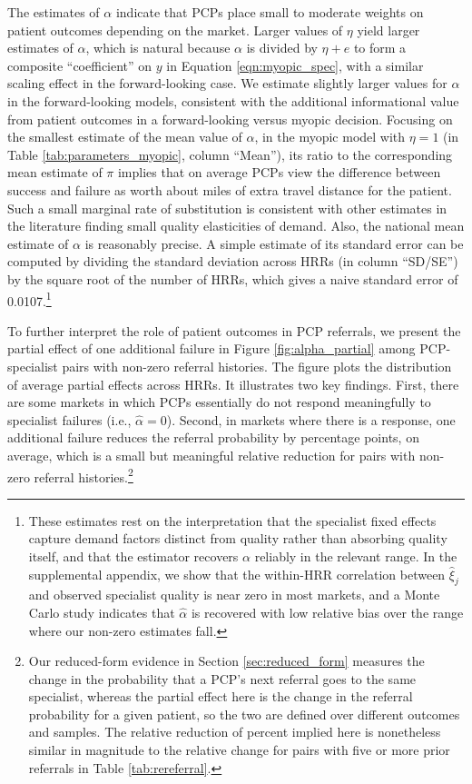 \documentclass[12pt]{article}
\begin{document}
The estimates of $\alpha$ indicate that PCPs place small to moderate weights on patient outcomes depending on the market. Larger values of $\eta$ yield larger estimates of $\alpha$, which is natural because $\alpha$ is divided by $\eta + e$ to form a composite ``coefficient'' on $y$ in Equation \eqref{eqn:myopic_spec}, with a similar scaling effect in the forward-looking case. We estimate slightly larger values for $\alpha$ in the forward-looking models, consistent with the additional informational value from patient outcomes in a forward-looking versus myopic decision. Focusing on the smallest estimate of the mean value of $\alpha$, in the myopic model with $\eta = 1$ (in Table \ref{tab:parameters_myopic}, column ``Mean''), its ratio to the corresponding mean estimate of $\pi$ implies that on average PCPs view the difference between success and failure as worth about \alphaDistRatioMyopic{} miles of extra travel distance for the patient. Such a small marginal rate of substitution is consistent with other estimates in the literature finding small quality elasticities of demand. Also, the national mean estimate of $\alpha$ is reasonably precise. A simple estimate of its standard error can be computed by dividing the standard deviation across HRRs (in column ``SD/SE'') by the square root of the number of HRRs, which gives a naive standard error of 0.0107.\footnote{These estimates rest on the interpretation that the specialist fixed effects capture demand factors distinct from quality rather than absorbing quality itself, and that the estimator recovers $\alpha$ reliably in the relevant range. In the supplemental appendix, we show that the within-HRR correlation between $\hat\xi_j$ and observed specialist quality is near zero in most markets, and a Monte Carlo study indicates that $\hat\alpha$ is recovered with low relative bias over the range where our non-zero estimates fall.}

To further interpret the role of patient outcomes in PCP referrals, we present the partial effect of one additional failure in Figure \ref{fig:alpha_partial} among PCP-specialist pairs with non-zero referral histories. The figure plots the distribution of average partial effects across HRRs. It illustrates two key findings. First, there are some markets in which PCPs essentially do not respond meaningfully to specialist failures (i.e., $\hat \alpha = 0$). Second, in markets where there is a response, one additional failure reduces the referral probability by \partialFXNonzeroMyopic{} percentage points, on average, which is a small but meaningful relative reduction for pairs with non-zero referral histories.\footnote{Our reduced-form evidence in Section \ref{sec:reduced_form} measures the change in the probability that a PCP's next referral goes to the same specialist, whereas the partial effect here is the change in the referral probability for a given patient, so the two are defined over different outcomes and samples. The relative reduction of \partialFXRelativeMyopic{} percent implied here is nonetheless similar in magnitude to the relative change for pairs with five or more prior referrals in Table \ref{tab:rereferral}.}
\end{document}
